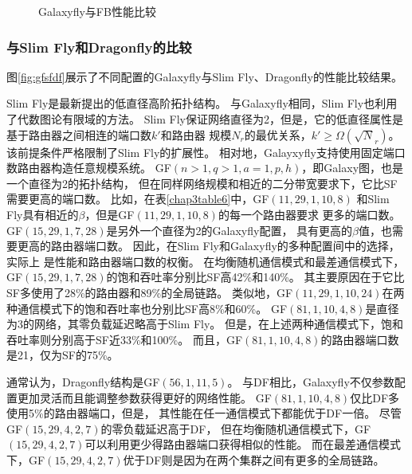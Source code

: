 \begin{figure}
  \centering
  \begin{minipage}[t]{\textwidth}
    \centering
    \caption{Galaxyfly与FB性能比较}
    \label{fig:gffb}
  \end{minipage}
\end{figure}

\subsubsection{与Slim Fly和Dragonfly的比较}
图\ref{fig:gfsfdf}展示了不同配置的Galaxyfly与Slim Fly、Dragonfly的性能比较结果。

Slim Fly是最新提出的低直径高阶拓扑结构。
与Galaxyfly相同，Slim Fly也利用了代数图论有限域的方法。
Slim Fly保证网络直径为2，但是，它的低直径属性是基于路由器之间相连的端口数$k'$和路由器
规模$N_r$的最优关系，$k'\geq\Omega(\sqrt N_r)$。
该前提条件严格限制了Slim Fly的扩展性。
相对地，Galayxyfly支持使用固定端口数路由器构造任意规模系统。
GF$(n>1,q>1,a=1,p,h)$，即Galaxy图，也是一个直径为2的拓扑结构，
但在同样网络规模和相近的二分带宽要求下，它比SF需要更高的端口数。
比如，在表\ref{chap3table6}中，GF$(11,29,1,10,8)$
和Slim Fly具有相近的$\beta$，但是GF$(11,29,1,10,8)$的每一个路由器要求
更多的端口数。
GF$(15,29,1,7,28)$是另外一个直径为2的Galaxyfly配置，
具有更高的$\beta$值，也需要更高的路由器端口数。
因此，在Slim Fly和Galaxyfly的多种配置间中的选择，实际上
是性能和路由器端口数的权衡。
在均衡随机通信模式和最差通信模式下，
GF$(15,29,1,7,28)$的饱和吞吐率分别比SF高42\%和140\%。
其主要原因在于它比SF多使用了28\%的路由器和89\%的全局链路。
类似地，GF$(11,29,1,10,24)$在两种通信模式下的饱和吞吐率也分别比SF高8\%和60\%。
GF$(81,1,10,4,8)$是直径为3的网络，其零负载延迟略高于Slim Fly。
但是，在上述两种通信模式下，饱和吞吐率则分别高于SF近33\%和100\%。
而且，GF$(81,1,10,4,8)$的路由器端口数是21，仅为SF的75\%。

通常认为，Dragonfly结构是GF$(56,1,11,5)$。
与DF相比，Galaxyfly不仅参数配置更加灵活而且能调整参数获得更好的网络性能。
GF$(81,1,10,4,8)$仅比DF多使用5\%的路由器端口，但是，
其性能在任一通信模式下都能优于DF一倍。
尽管GF$(15,29,4,2,7)$的零负载延迟高于DF，
但在均衡随机通信模式下，GF$(15,29,4,2,7)$可以利用更少得路由器端口获得相似的性能。
而在最差通信模式下，GF$(15,29,4,2,7)$优于DF则是因为在两个集群之间有更多的全局链路。

